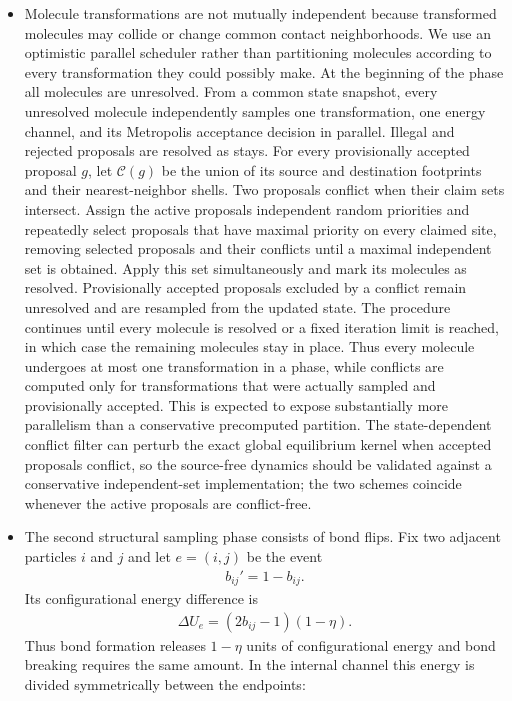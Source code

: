 \documentclass[12pt,letterpaper]{article}
\newcommand{\mc}{\mathcal}
\begin{document}
\begin{itemize}
\item Molecule transformations are not mutually independent because transformed molecules may collide or change common contact neighborhoods. We use an optimistic parallel scheduler rather than partitioning molecules according to every transformation they could possibly make. At the beginning of the phase all molecules are unresolved. From a common state snapshot, every unresolved molecule independently samples one transformation, one energy channel, and its Metropolis acceptance decision in parallel. Illegal and rejected proposals are resolved as stays. For every provisionally accepted proposal $g$, let $\mc{C}(g)$ be the union of its source and destination footprints and their nearest-neighbor shells. Two proposals conflict when their claim sets intersect. Assign the active proposals independent random priorities and repeatedly select proposals that have maximal priority on every claimed site, removing selected proposals and their conflicts until a maximal independent set is obtained. Apply this set simultaneously and mark its molecules as resolved. Provisionally accepted proposals excluded by a conflict remain unresolved and are resampled from the updated state. The procedure continues until every molecule is resolved or a fixed iteration limit is reached, in which case the remaining molecules stay in place. Thus every molecule undergoes at most one transformation in a phase, while conflicts are computed only for transformations that were actually sampled and provisionally accepted. This is expected to expose substantially more parallelism than a conservative precomputed partition. The state-dependent conflict filter can perturb the exact global equilibrium kernel when accepted proposals conflict, so the source-free dynamics should be validated against a conservative independent-set implementation; the two schemes coincide whenever the active proposals are conflict-free.
\item The second structural sampling phase consists of bond flips. Fix two adjacent particles $i$ and $j$ and let $e=(i,j)$ be the event
\begin{align*}
b_{ij}'=1-b_{ij}.
\end{align*}
Its configurational energy difference is
\begin{align*}
\Delta U_{e}=(2b_{ij}-1)(1-\eta).
\end{align*}
Thus bond formation releases $1-\eta$ units of configurational energy and bond breaking requires the same amount. In the internal channel this energy is divided symmetrically between the endpoints:

\end{itemize}
\end{document}
